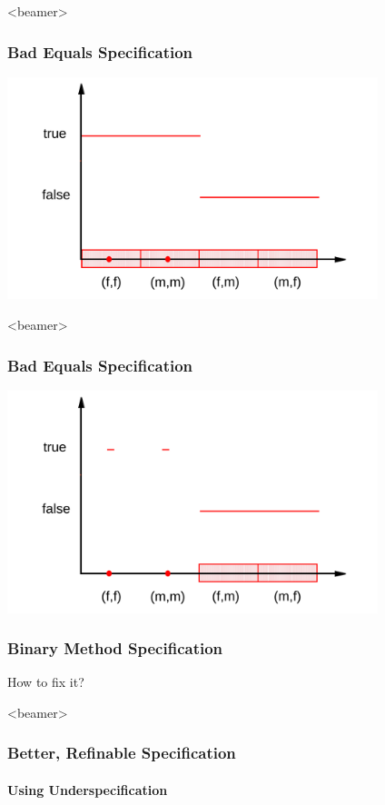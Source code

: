 \begin{frame}<beamer>
\frametitle{Bad Equals Specification}
\includegraphics[width=4.25in]{equalsbad1}
\end{frame}

\begin{frame}<beamer>
\frametitle{Bad Equals Specification}
\transdissolve[duration=0.5]
\includegraphics[width=4.25in]{equalsbad2}
\end{frame}

\begin{frame}
\frametitle{Binary Method Specification}
\begin{question}
How to fix it?

\rm

\end{question}
\end{frame}

\begin{frame}<beamer>
\frametitle{Better, Refinable Specification}
\framesubtitle{Using Underspecification}

\end{frame}

